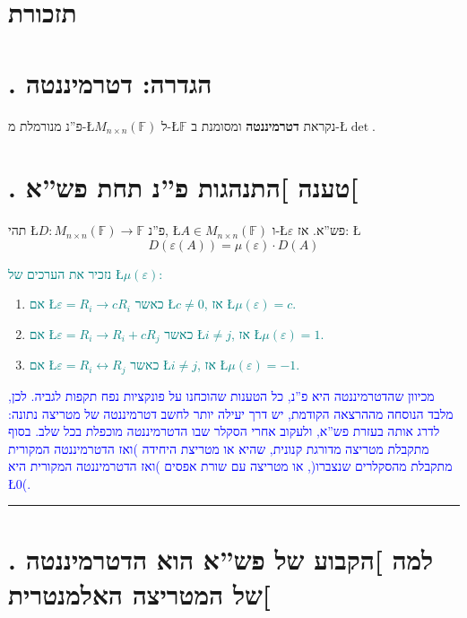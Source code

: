 \documentclass[english,hebrew]{article}
\begin{document}
\section{תזכורת}

\section{{\endL}. הגדרה: דטרמיננטה}

פ\textquotedblright נ מנורמלת מ-\L{$M_{n\times n}(\mathbb{F})$} ל-\L{$\mathbb{F}$}
נקראת \textbf{דטרמיננטה} ומסומנת ב-\L{$\det$}.

\section{{\endL}. טענה {]}התנהגות פ\textquotedblright נ תחת פש\textquotedblright א{[}}

תהי \L{$D:M_{n\times n}(\mathbb{F})\to\mathbb{F}$} פ\textquotedblright נ,
\L{$A\in M_{n\times n}(\mathbb{F})$} ו-\L{$\varepsilon$} פש\textquotedblright א.
אז: \L{%
\[
D(\varepsilon(A))=\mu(\varepsilon)\cdot D(A)
\]
}%

\textcolor{teal}{נזכיר את הערכים של \L{$\mu(\varepsilon)$}:}
\begin{enumerate}
\item \textcolor{teal}{אם \L{$\varepsilon=R_{i}\to cR_{i}$} כאשר \L{$c\neq0$},
אז \L{$\mu(\varepsilon)=c$}.}
\item \textcolor{teal}{אם \L{$\varepsilon=R_{i}\to R_{i}+cR_{j}$} כאשר
\L{$i\neq j$}, אז \L{$\mu(\varepsilon)=1$}.}
\item \textcolor{teal}{אם \L{$\varepsilon=R_{i}\leftrightarrow R_{j}$}
כאשר \L{$i\neq j$}, אז \L{$\mu(\varepsilon)=-1$}.}
\end{enumerate}
\medskip{}

\textcolor{blue}{מכיוון שהדטרמיננטה היא פ\textquotedblright נ, כל
הטענות שהוכחנו על פונקציות נפח תקפות לגביה. לכן, מלבד הנוסחה מההרצאה
הקודמת, יש דרך יעילה יותר לחשב דטרמיננטה של מטריצה נתונה: לדרג אותה
בעזרת פש\textquotedblright א, ולעקוב אחרי הסקלר שבו הדטרמיננטה מוכפלת
בכל שלב. בסוף מתקבלת מטריצה מדורגת קנונית, שהיא או מטריצת היחידה )ואז
הדטרמיננטה המקורית מתקבלת מהסקלרים שנצברו(, או מטריצה עם שורת אפסים
)ואז הדטרמיננטה המקורית היא \L{$0$}(.}

\medskip{}

\rule[0.5ex]{1\columnwidth}{1pt}

\medskip{}

\section{{\endL}. למה {]}הקבוע של פש\textquotedblright א הוא הדטרמיננטה
של המטריצה האלמנטרית{[}}
\end{document}
